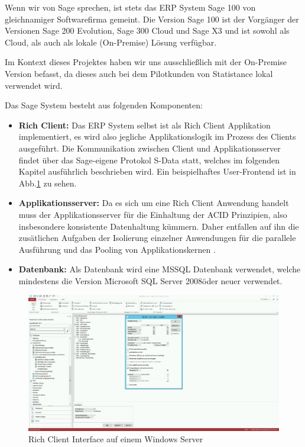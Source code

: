 Wenn wir von Sage sprechen, ist stets das ERP System Sage 100 von gleichnamiger Softwarefirma gemeint. Die Version Sage 100 ist der Vorgänger der Versionen Sage 200 Evolution, Sage 300 Cloud und Sage X3 und ist sowohl als Cloud, als auch als lokale (On-Premise) Lösung verfügbar.

Im Kontext dieses Projektes haben wir uns ausschließlich mit der On-Premise Version befasst, da dieses auch bei dem Pilotkunden von Statistance lokal verwendet wird.

Das Sage System besteht aus folgenden Komponenten:

\begin{itemize}
  \item \textbf{Rich Client: } Das ERP System selbst ist als Rich Client Applikation implementiert, es wird also jegliche Applikationslogik im Prozess des Clients ausgeführt. Die Kommunikation zwischen Client und Applikationsserver findet über das Sage-eigene Protokol S-Data statt, welches im folgenden Kapitel ausführlich beschrieben wird.  Ein beispielhaftes User-Frontend ist in Abb.\ref{fig:sage_screenshot} zu sehen.

  \item \textbf{Applikationsserver: } 
  Da es sich um eine Rich Client Anwendung handelt muss der Applikationsserver für die Einhaltung der ACID Prinzipien, also insbesondere konsistente Datenhaltung kümmern. Daher entfallen auf ihn die zusätlichen Aufgaben der Isolierung einzelner Anwendungen für die parallele Ausführung und das Pooling von Applikationskernen \cite{sageadministrationshandbuch}.
  \item \textbf{Datenbank: } Als Datenbank wird eine MSSQL Datenbank verwendet, welche mindestens die Version \"Microsoft SQL Server 2008\" oder neuer verwendet.
\end{itemize}

\begin{figure}[!h]
\centering
\includegraphics[width=13.5cm]{images/03_SAGE/Sage_100_Screenshot.png}
\caption{Rich Client Interface auf einem Windows Server}
\label{fig:sage_screenshot}
\end{figure}

